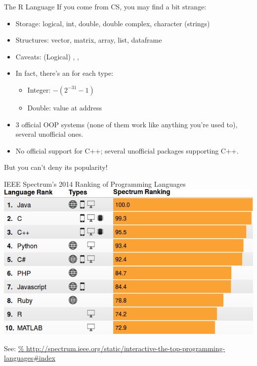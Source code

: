 \begin{frame}
\begin{block}{The R Language}\pause
  If you come from CS, you may find \R a bit strange:
  \begin{itemize}
    \item Storage: logical, int, double, double complex, character (strings)
    \item Structures: vector, matrix, array, list, dataframe
    \item Caveats: (Logical) , , 
    \item In fact, there's an  for each type:
    \begin{itemize}
      \item Integer: $-\left(2^{-31}-1\right)$
      \item Double: value at address 
    \end{itemize}
    \item 3 official OOP systems (none of them work like anything you're used 
to), several unofficial ones.
    \item No official support for C++; several unofficial packages supporting 
C++.
  \end{itemize}
\end{block}
\end{frame}



\begin{frame}{But you can't deny its popularity!}
  \begin{center}
    IEEE Spectrum's 2014 Ranking of Programming Languages\\
    \includegraphics[scale=.6]{../common/pics/ieee_spectrum}
  \end{center}
 {\scriptsize See: 
\url{%
http://spectrum.ieee.org/static/interactive-the-top-programming-languages\#index
}}
\end{frame}




